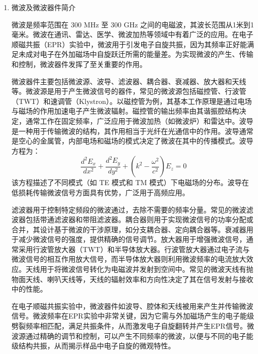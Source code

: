 \documentclass[dvipsnames, svgnames,a4paper,11pt]{article}
\begin{document}
\begin{enumerate}
		\item 微波及微波器件简介
		
		微波是频率范围在 300 MHz 至 300 GHz 之间的电磁波，其波长范围从1米到1毫米。微波在通讯、雷达、医学、微波加热等领域中有着广泛的应用。在电子顺磁共振（EPR）实验中，微波用于引发电子自旋共振，因为其频率正好能满足未成对电子在外加磁场中自旋跃迁所需的能量差。为实现微波的产生、传输和控制，微波器件发挥了至关重要的作用。
		
		
		微波器件主要包括微波源、波导、滤波器、耦合器、衰减器、放大器和天线等。微波源是用于产生微波信号的器件，常见的微波源包括磁控管、行波管（TWT）和速调管（Klystron）。以磁控管为例，其基本工作原理是通过电场与磁场的作用加速电子产生微波辐射。磁控管的输出频率由其谐振腔结构决定，通常工作在固定频率，广泛应用于微波加热（如微波炉）和雷达中。波导是一种用于传输微波的结构，其作用相当于光纤在光通信中的作用。波导通常是空心的金属管，内部电场和磁场的模式决定了微波在其中的传播模式。波导方程为：\[ \frac{d^2 E_x}{dx^2} + \frac{d^2 E_y}{dy^2} + \left( k^2 - \frac{\omega^2}{c^2} \right) E_z = 0 \]该方程描述了不同模式（如 TE 模式和 TM 模式）下电磁场的分布。波导在低损耗传输微波信号方面具有优势，广泛用于高频应用。
		
		滤波器用于控制特定频段的微波通过，去除不需要的频率分量。常见的微波滤波器包括带通滤波器和带阻滤波器。耦合器则用于实现微波信号的功率分配或合并，其设计基于微波的干涉原理，如分支耦合器、定向耦合器等。衰减器用于减少微波信号的强度，提供精确的信号调节。放大器用于增强微波信号，通常采用行波管放大器（TWT）和半导体放大器。行波管放大器通过电子流与微波信号的相互作用放大信号，而半导体放大器则利用微波频率的电流放大效应。天线用于将微波信号转化为电磁波并发射到空间中。常见的微波天线有抛物面天线、喇叭天线等，天线的辐射效率和方向性决定了其在信号发射与接收中的性能。
		
		
		在电子顺磁共振实验中，微波器件如波导、腔体和天线被用来产生并传输微波信号。微波频率在EPR实验中非常关键，因为它需与外加磁场产生的电子能级劈裂频率相匹配，满足共振条件，从而激发电子自旋翻转并产生EPR信号。微波源通过精确的调节和控制，可以产生不同频率的微波，以便与不同的电子能级结构共振，从而揭示样品中电子自旋的微观特性。
	\end{enumerate}
\end{document}
